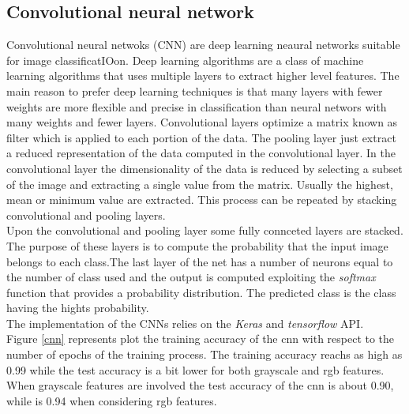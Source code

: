 \documentclass{article}
\begin{document}
\subsection{Convolutional neural network}
Convolutional neural netwoks (CNN) are deep learning neaural networks suitable for image classificatIOon. Deep learning algorithms are a class of machine learning algorithms that uses multiple layers to extract higher level features. The main reason to prefer deep learning techniques is that many layers with fewer weights are more flexible and precise in classification than neural networs with many weights and fewer layers.    
Convolutional layers optimize a matrix known as filter which is applied to each portion of the data.
The pooling layer just extract a reduced representation of the data computed in the convolutional layer. In the convolutional layer the dimensionality of the data is reduced by selecting a subset of the image and extracting a single value from the matrix. Usually the highest, mean or minimum value are extracted. This process can be repeated by stacking convolutional and pooling layers.\\
Upon the convolutional and pooling layer some fully connceted layers are stacked. The purpose of these layers is to compute the probability that the input image belongs to each class.The last layer of the net has a number of neurons equal to the number of class used and the output is computed exploiting the \textit{softmax} function that provides a probability distribution. The predicted class is the class having the hights probability. \\
The implementation of the CNNs relies on the \textit{Keras} and \textit{tensorflow} API.\\
Figure \ref{cnn} represents plot the training accuracy of the cnn with respect to the number of epochs of the training process. The training accuracy reachs as high as 0.99 while the test accuracy is a bit lower for both grayscale and rgb features.
When grayscale features are involved the test accuracy of the cnn is about 0.90, while is 0.94 when considering rgb features.
\end{document}
